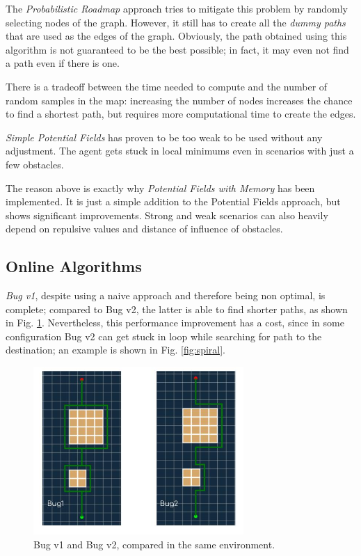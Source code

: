 \documentclass[conference]{IEEEtran}
\begin{document}
The \textit{Probabilistic Roadmap} approach tries to mitigate this problem by randomly selecting nodes of the graph. However, it still has to create all the \emph{dummy paths} that are used as the edges of the graph. Obviously, the path obtained using this algorithm is not guaranteed to be the best possible; in fact, it may even not find a path even if there is one.

There is a tradeoff between the time needed to compute and the number of random samples in the map: increasing the number of nodes increases the chance to find a shortest path, but requires more computational time to create the edges.

\textit{Simple Potential Fields} has proven to be too weak to be used without any adjustment. The agent gets stuck in local minimums even in scenarios with just a few obstacles.

The reason above is exactly why \textit{Potential Fields with Memory} has been implemented. It is just a simple addition to the Potential Fields approach, but shows significant improvements.
Strong and weak scenarios can also heavily depend on repulsive values and distance of influence of obstacles.

\subsection{Online Algorithms}
\textit{Bug v1}, despite using a naive approach and therefore being non optimal, is complete; compared to Bug v2, the latter is able to find shorter paths, as shown in Fig. \ref{fig:Bug1vsBug2}.
Nevertheless, this performance improvement has a cost, since in some configuration Bug v2 can get stuck in loop while searching for path to the destination; an example is shown in Fig. \ref{fig:spiral}.

\begin{figure}[]
	\includegraphics[width=8cm]{Bug1vsBug2.jpg}
	\centering
	\caption{Bug v1 and Bug v2, compared in the same environment.}
	\label{fig:Bug1vsBug2}
\end{figure}
\end{document}
